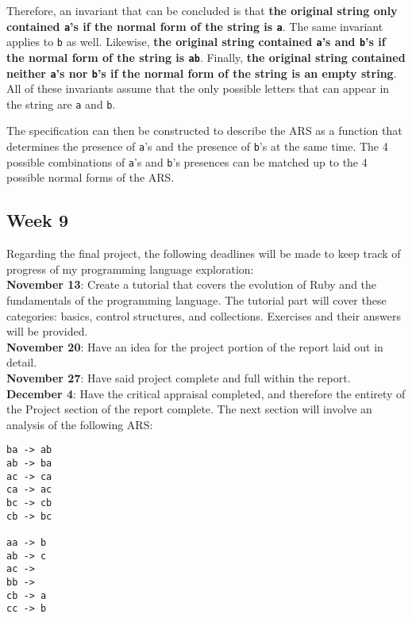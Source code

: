 \documentclass{article}
\theoremstyle{theorem}
\theoremstyle{definition}
\theoremstyle{remark}
\begin{document}
Therefore, an invariant that can be concluded is that \textbf{the original string only contained \texttt{a}'s if the normal form of the string is \texttt{a}}. The same invariant applies to \texttt{b} as well. Likewise, \textbf{the original string contained \texttt{a}'s and \texttt{b}'s if the normal form of the string is \texttt{ab}}. Finally, \textbf{the original string contained neither \texttt{a}'s nor \texttt{b}'s if the normal form of the string is an empty string}. All of these invariants assume that the only possible letters that can appear in the string are \texttt{a} and \texttt{b}.

The specification can then be constructed to describe the ARS as a function that determines the presence of \texttt{a}'s and the presence of \texttt{b}'s at the same time. The 4 possible combinations of \texttt{a}'s and \texttt{b}'s presences can be matched up to the 4 possible normal forms of the ARS.

\newpage

\subsection{Week 9}
Regarding the final project, the following deadlines will be made to keep track of progress of my programming language exploration:\\

\noindent \textbf{November 13}: Create a tutorial that covers the evolution of Ruby and the fundamentals of the programming language. The tutorial part will cover these categories: basics, control structures, and collections. Exercises and their answers will be provided.\\

\noindent \textbf{November 20}: Have an idea for the project portion of the report laid out in detail.\\

\noindent \textbf{November 27}: Have said project complete and full within the report.\\

\noindent \textbf{December 4}: Have the critical appraisal completed, and therefore the entirety of the Project section of the report complete.
\newpage
\noindent The next section will involve an analysis of the following ARS:
\begin{lstlisting}
ba -> ab
ab -> ba
ac -> ca
ca -> ac
bc -> cb
cb -> bc
 
aa -> b
ab -> c
ac ->  
bb ->
cb -> a
cc -> b
\end{lstlisting}
\end{document}
